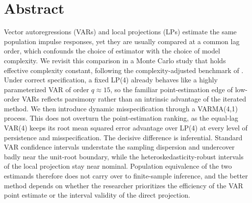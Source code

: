 
\section*{Abstract}
\thispagestyle{empty}

Vector autoregressions (VARs) and local projections (LPs) estimate the same population impulse
responses, yet they are usually compared at a common lag order, which confounds the choice of
estimator with the choice of model complexity. We revisit this comparison in a Monte Carlo study
that holds effective complexity constant, following the complexity-adjusted benchmark of
\textcite{ludwig2026local}. Under correct specification, a fixed LP(4) already behaves like a
highly parameterized VAR of order $q \approx 15$, so the familiar point-estimation edge of
low-order VARs reflects parsimony rather than an intrinsic advantage of the iterated method. We
then introduce dynamic misspecification through a VARMA(4,1) process. This does not overturn the
point-estimation ranking, as the equal-lag VAR(4) keeps its root mean squared error advantage over
LP(4) at every level of persistence and misspecification. The decisive difference is inferential.
Standard VAR confidence intervals understate the sampling dispersion and undercover badly near the
unit-root boundary, while the heteroskedasticity-robust intervals of the local projection stay near
nominal. Population equivalence of the two estimands therefore does not carry over to finite-sample
inference, and the better method depends on whether the researcher prioritizes the efficiency of the
VAR point estimate or the interval validity of the direct projection.

\clearpage
